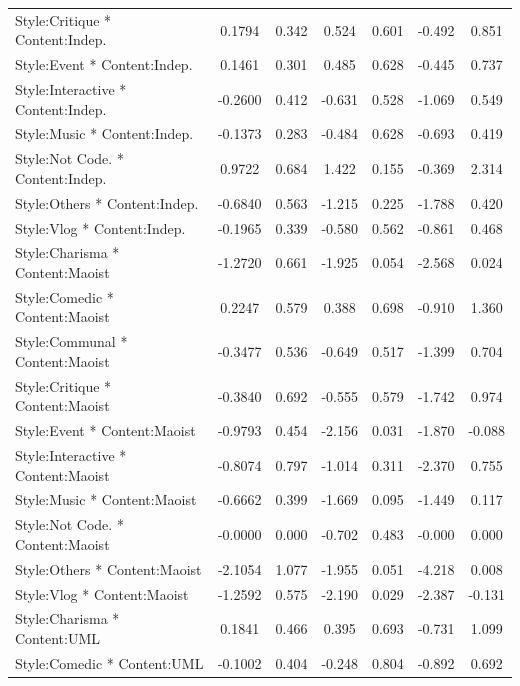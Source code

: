 \documentclass[12pt,a4paper]{report}
\begin{document}
\begin{table}
\begin{tabular}{@{}l S[table-format=-1.4] S[table-format=1.3] S[table-format=-1.3] S[table-format=1.3] S[table-format=-1.3] S[table-format=1.3]@{}}
        Style:Critique * Content:Indep.      & 0.1794  & 0.342 & 0.524  & 0.601 & -0.492 & 0.851 \\
        Style:Event * Content:Indep.         & 0.1461  & 0.301 & 0.485  & 0.628 & -0.445 & 0.737 \\
        Style:Interactive * Content:Indep.   & -0.2600 & 0.412 & -0.631 & 0.528 & -1.069 & 0.549 \\
        Style:Music * Content:Indep.         & -0.1373 & 0.283 & -0.484 & 0.628 & -0.693 & 0.419 \\
        Style:Not Code. * Content:Indep.     & 0.9722  & 0.684 & 1.422  & 0.155 & -0.369 & 2.314 \\
        Style:Others * Content:Indep.        & -0.6840 & 0.563 & -1.215 & 0.225 & -1.788 & 0.420 \\
        Style:Vlog * Content:Indep.          & -0.1965 & 0.339 & -0.580 & 0.562 & -0.861 & 0.468 \\ \addlinespace
        Style:Charisma * Content:Maoist      & -1.2720 & 0.661 & -1.925 & 0.054 & -2.568 & 0.024 \\
        Style:Comedic * Content:Maoist       & 0.2247  & 0.579 & 0.388  & 0.698 & -0.910 & 1.360 \\
        Style:Communal * Content:Maoist      & -0.3477 & 0.536 & -0.649 & 0.517 & -1.399 & 0.704 \\
        Style:Critique * Content:Maoist      & -0.3840 & 0.692 & -0.555 & 0.579 & -1.742 & 0.974 \\
        Style:Event * Content:Maoist         & -0.9793 & 0.454 & -2.156 & 0.031 & -1.870 & -0.088 \\
        Style:Interactive * Content:Maoist   & -0.8074 & 0.797 & -1.014 & 0.311 & -2.370 & 0.755 \\
        Style:Music * Content:Maoist         & -0.6662 & 0.399 & -1.669 & 0.095 & -1.449 & 0.117 \\
        Style:Not Code. * Content:Maoist     & -0.0000 & 0.000 & -0.702 & 0.483 & -0.000 & 0.000 \\
        Style:Others * Content:Maoist        & -2.1054 & 1.077 & -1.955 & 0.051 & -4.218 & 0.008 \\
        Style:Vlog * Content:Maoist          & -1.2592 & 0.575 & -2.190 & 0.029 & -2.387 & -0.131 \\ \addlinespace
        Style:Charisma * Content:UML         & 0.1841  & 0.466 & 0.395  & 0.693 & -0.731 & 1.099 \\
        Style:Comedic * Content:UML          & -0.1002 & 0.404 & -0.248 & 0.804 & -0.892 & 0.692 \\

\end{tabular}
\end{table}
\end{document}
